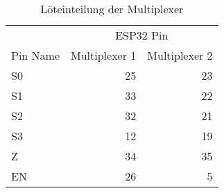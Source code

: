\begin{table}[htbp]
  \centering
  
    \begin{tabular}{|l|r|r|}
    \hline
          & \multicolumn{2}{c|}{ESP32 Pin} \\
    Pin Name & \multicolumn{1}{l|}{Multiplexer 1} & \multicolumn{1}{l|}{Multiplexer 2} \\
    \hline
    S0    & 25    & 23 \\
    \hline
    S1    & 33    & 22 \\
    \hline
    S2    & 32    & 21 \\
    \hline
    S3    & 12    & 19 \\
    \hline
    Z     & 34    & 35 \\
    \hline
    EN    & 26    & 5 \\
    \hline
    \end{tabular}%
    \caption{Löteinteilung der Multiplexer}
  \label{tab:multiESP}%
\end{table}%